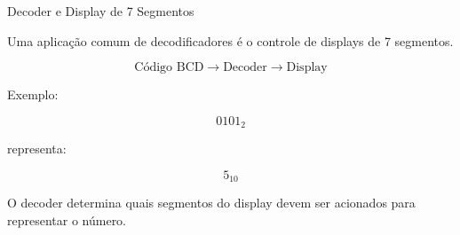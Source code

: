 \begin{frame}{Decoder e Display de 7 Segmentos}

    Uma aplicação comum de decodificadores é o controle
    de displays de 7 segmentos.

    \[
        \boxed{\text{Código BCD}}
        \longrightarrow
        \boxed{\text{Decoder}}
        \longrightarrow
        \boxed{\text{Display}}
    \]

    \vspace{0.4cm}

    Exemplo:

    \[
        0101_2
    \]

    representa:

    \[
        5_{10}
    \]

    O decoder determina quais segmentos do display
    devem ser acionados para representar o número.

\end{frame}
